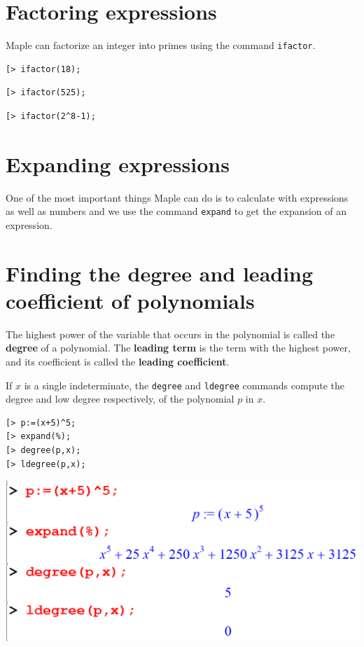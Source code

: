 \documentclass[
]{book}
\theoremstyle{definition}
\theoremstyle{definition}
\theoremstyle{definition}
\theoremstyle{definition}
\theoremstyle{remark}
\begin{document}
\section{Factoring expressions}\label{factoring-expressions}

Maple can factorize an integer into primes using the command \texttt{ifactor}.

\begin{verbatim}
[> ifactor(18);
\end{verbatim}

\begin{verbatim}
[> ifactor(525);
\end{verbatim}

\begin{verbatim}
[> ifactor(2^8-1);
\end{verbatim}

\section{Expanding expressions}\label{expanding-expressions}

One of the most important things Maple can do is to calculate with expressions as well as numbers and we use the command \texttt{expand} to get the expansion of an expression.

\section{Finding the degree and leading coefficient of polynomials}\label{finding-the-degree-and-leading-coefficient-of-polynomials}

The highest power of the variable that occurs in the polynomial is called the \textbf{degree} of a polynomial.
The \textbf{leading term} is the term with the highest power, and its coefficient is called the \textbf{leading coefficient}.

If \(x\) is a single indeterminate, the \texttt{degree} and \texttt{ldegree} commands compute the degree and low degree respectively, of the polynomial \(p\) in \(x\).

\begin{verbatim}
[> p:=(x+5)^5;
[> expand(%);
[> degree(p,x);
[> ldegree(p,x);
\end{verbatim}

\includegraphics{figures/Lesson 1/fig54.png}
\end{document}
